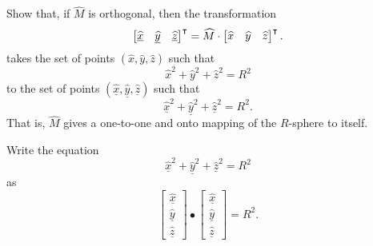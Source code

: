 \documentclass[newpage,hints,handout,12pt,noauthor,nooutcomes]{ximera}
\begin{document}
\begin{problem}
  Show that, if $\hat{M}$ is orthogonal, then the transformation
  \[
  \begin{bmatrix}
    \underline{\widehat{x}} & \underline{\widehat{y}} & \underline{\widehat{z}}
  \end{bmatrix}^\intercal
  =\widehat M \cdot \begin{bmatrix}
    \widehat{x} & \widehat{y} & \widehat{z}
  \end{bmatrix}^\intercal.
  \]
  takes the set of points $\left(\hat{x},\hat{y},\hat{z}\right)$ such
  that
\[
\hat{x}^2 + \hat{y}^2 + \hat{z}^2 = R^2
\]
to the set of points
$\left(\underline{\hat{x}},\underline{\hat{y}},\underline{\hat{z}}\right)$
such that
\[
\underline{\hat{x}}^2 + \underline{\hat{y}}^{2} + \underline{\hat{z}}^{2}=R^2.
\]
That is, $\hat{M}$ gives a one-to-one and onto mapping of the $R$-sphere to
itself.
\begin{hint}
  Write the equation
  \[
  \underline{\hat{x}}^2 + \underline{\hat{y}}^{2} + \underline{\hat{z}}^{2}=R^2
  \]
  as
  \[
  \begin{bmatrix}
    \underline{\hat{x}} \\ \underline{\hat{y}} \\ \underline{\hat{z}}%
  \end{bmatrix}  
  \bullet
  \begin{bmatrix}
    \underline{\hat{x}} \\ \underline{\hat{y}} \\ \underline{\hat{z}}
  \end{bmatrix}=R^2.
  \]
\end{hint}


\end{problem}
\end{document}
